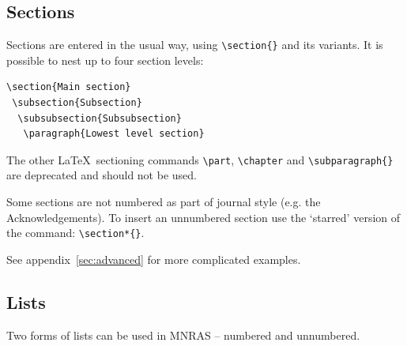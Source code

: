 \documentclass[a4paper,fleqn,usenatbib,useAMS]{mnras}
\begin{document}
\subsection{Sections}
\label{sec:sections}
Sections are entered in the usual way, using \verb'\section{}' and its variants. It is possible to nest up to four section levels:
\begin{verbatim}
\section{Main section}
 \subsection{Subsection}
  \subsubsection{Subsubsection}
   \paragraph{Lowest level section}
\end{verbatim}
\noindent The other \LaTeX\ sectioning commands \verb'\part', \verb'\chapter' and \verb'\subparagraph{}' are deprecated and should not be used.

Some sections are not numbered as part of journal style (e.g. the Acknowledgements).
To insert an unnumbered section use the `starred' version of the command: \verb'\section*{}'.

See appendix~\ref{sec:advanced} for more complicated examples.

\subsection{Lists}

Two forms of lists can be used in MNRAS -- numbered and unnumbered.
\end{document}
